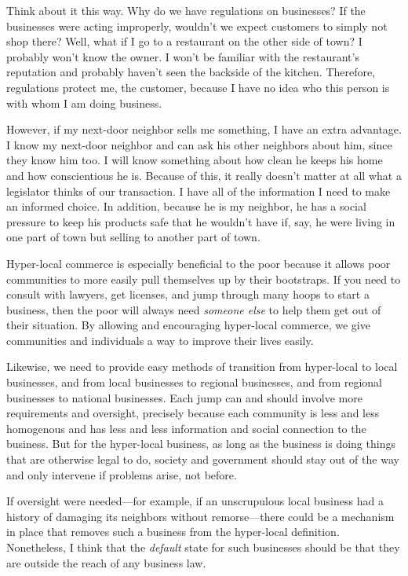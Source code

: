 Think about it this way. Why do we have regulations on businesses?  If
the businesses were acting improperly, wouldn't we
expect customers to simply not shop there?  Well,
what if I go to a
restaurant on the other side of town? I probably won't
know the owner. I won't be familiar with the
restaurant's reputation and probably haven’t seen the
backside of the kitchen. Therefore, regulations protect me, the
customer, because I have no idea who this person is with whom I am
doing business.

However, if my next-door neighbor sells me something, I have an extra
advantage. I know my next-door neighbor and can ask his other neighbors
about him, since they know him too. I will know something about how
clean he keeps his home and how conscientious he is. Because of this,
it really doesn't matter at all what a legislator
thinks of our transaction. I have all of the information I need to make
an informed choice. In addition, because he is my neighbor, he has a
social pressure to keep his products safe that he
wouldn't have if, say, he were living in one part of
town but selling to another part of town.

Hyper-local commerce
is especially beneficial to the poor because it allows poor communities
to more easily pull themselves up by their bootstraps. If you need to
consult with lawyers, get licenses, and jump through many hoops to
start a business, then the poor will always need \textit{someone else}
to help them get out of their situation. By allowing and encouraging
hyper-local commerce, we give communities and individuals a way to
improve their lives easily.

Likewise, we need to provide easy methods of transition from hyper-local
to local businesses, and from local businesses to regional businesses,
and from regional businesses to national businesses. Each jump can and
should involve more requirements and oversight, precisely because each
community is less and less homogenous and has less and less information
and social connection to the business. But for the hyper-local
business, as long as the business is doing things that are otherwise
legal to do, society and government should stay out of the way and only intervene if
problems arise, not before.

If oversight were
needed---for example, if an unscrupulous local business had a history of damaging its
neighbors without remorse---there could be a mechanism in place that
removes such a business from the hyper-local definition.  Nonetheless,
I think that the \textit{default} state for such businesses should be that they
are outside the reach of any business law. 

